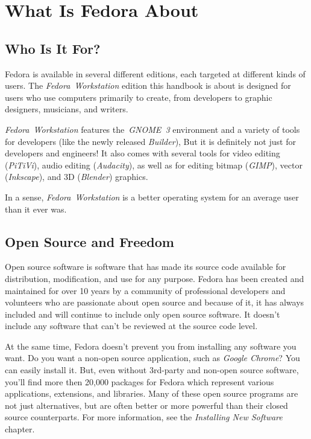 \chapter*{What Is Fedora About}
\section*{Who Is It For?}

Fedora is available in several different editions, each targeted at different kinds of users. The \emph{Fedora~Workstation} edition this handbook is about is designed for users who use computers primarily to create, from developers to graphic designers, musicians, and writers.

\emph{Fedora~Workstation} features the~\emph{GNOME~3} environment and a variety of tools for developers (like the newly released \emph{Builder}),  But it is definitely not just for developers and engineers! It also comes with several tools for video editing (\emph{PiTiVi}), audio editing (\emph{Audacity}), as well as for editing bitmap (\emph{GIMP}), vector (\emph{Inkscape}), and 3D (\emph{Blender}) graphics.

In a sense, \emph{Fedora~Workstation} is a better operating system for an average user than it ever was.

\section*{Open Source and Freedom}

Open source software is software that has made its source code available for distribution, modification, and use for any purpose. Fedora has been created and maintained for over 10 years by a community of professional developers and volunteers who are passionate about open source and because of it, it has always included and will continue to include only open source software. It doesn't include any software that can't be reviewed at the source code level.

At the same time, Fedora doesn't prevent you from installing any software you want. Do you want a non-open source application, such as \emph{Google Chrome}? You can easily install it. But, even without 3rd-party and non-open source software, you'll find more then 20,000 packages for Fedora which represent various applications, extensions, and libraries. Many of these open source programs are not just alternatives, but are often better or more powerful than their closed source counterparts. For more information, see the \emph{Installing New Software} chapter.

